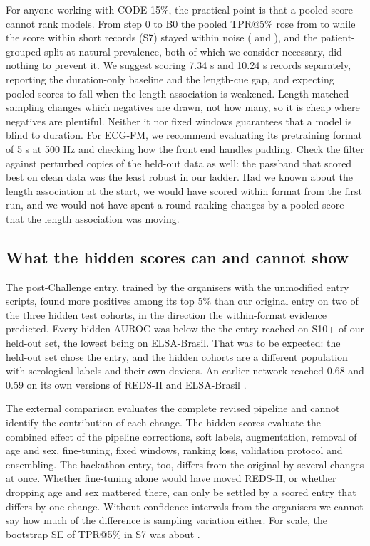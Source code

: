 \documentclass{iopjournal}
\makeatletter
\newcommand{\tpr}{TPR@5\%}
\makeatother
\begin{document}
For anyone working with CODE-15\%, the practical point is that a pooled score cannot rank models. From step 0 to B0 the pooled \tpr{} rose from \rowZeroA{} to \bzA{} while the score within short records (S7) stayed within noise (\rowZeroSseven{} and \bzSseven), and the patient-grouped split at natural prevalence, both of which we consider necessary, did nothing to prevent it. We suggest scoring 7.34 s and 10.24 s records separately, reporting the duration-only baseline and the length-cue gap, and expecting pooled scores to fall when the length association is weakened. Length-matched sampling changes which negatives are drawn, not how many, so it is cheap where negatives are plentiful. Neither it nor fixed windows guarantees that a model is blind to duration. For ECG-FM, we recommend evaluating its pretraining format of 5 s at 500 Hz and checking how the front end handles padding. Check the filter against perturbed copies of the held-out data as well: the passband that scored best on clean data was the least robust in our ladder. Had we known about the length association at the start, we would have scored within format from the first run, and we would not have spent a round ranking changes by a pooled score that the length association was moving.

\subsection{What the hidden scores can and cannot show}
The post-Challenge entry, trained by the organisers with the unmodified entry scripts, found more positives among its top 5\% than our original entry on two of the three hidden test cohorts, in the direction the within-format evidence predicted. Every hidden AUROC was below the \entryStenPlusAuc{} the entry reached on S10+ of our held-out set, the lowest being \extNewElsaAuc{} on ELSA-Brasil. That was to be expected: the held-out set chose the entry, and the hidden cohorts are a different population with serological labels and their own devices. An earlier network reached 0.68 and 0.59 on its own versions of REDS-II and ELSA-Brasil \citep{jidling2023}.

The external comparison evaluates the complete revised pipeline and cannot identify the contribution of each change. The hidden scores evaluate the combined effect of the pipeline corrections, soft labels, augmentation, removal of age and sex, fine-tuning, fixed windows, ranking loss, validation protocol and ensembling. The hackathon entry, too, differs from the original by several changes at once. Whether fine-tuning alone would have moved REDS-II, or whether dropping age and sex mattered there, can only be settled by a scored entry that differs by one change. Without confidence intervals from the organisers we cannot say how much of the difference is sampling variation either. For scale, the bootstrap SE of \tpr{} in S7 was about \seSsevenTpr.
\end{document}
